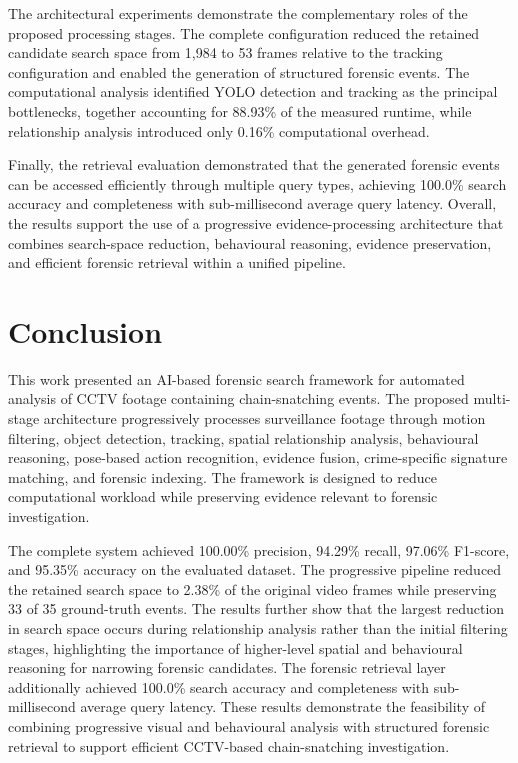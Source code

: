 \documentclass[runningheads]{llncs}
\begin{document}
The architectural experiments demonstrate the complementary roles of
the proposed processing stages. The complete configuration reduced the
retained candidate search space from 1,984 to 53 frames relative to the
tracking configuration and enabled the generation of structured
forensic events. The computational analysis identified YOLO detection
and tracking as the principal bottlenecks, together accounting for
88.93\% of the measured runtime, while relationship analysis introduced
only 0.16\% computational overhead.

Finally, the retrieval evaluation demonstrated that the generated
forensic events can be accessed efficiently through multiple query
types, achieving 100.0\% search accuracy and completeness with
sub-millisecond average query latency. Overall, the results support the
use of a progressive evidence-processing architecture that combines
search-space reduction, behavioural reasoning, evidence preservation,
and efficient forensic retrieval within a unified pipeline.

\section{Conclusion}
This work presented an AI-based forensic search framework for automated
analysis of CCTV footage containing chain-snatching events. The proposed
multi-stage architecture progressively processes surveillance footage
through motion filtering, object detection, tracking, spatial
relationship analysis, behavioural reasoning, pose-based action
recognition, evidence fusion, crime-specific signature matching, and
forensic indexing. The framework is designed to reduce computational
workload while preserving evidence relevant to forensic investigation.

The complete system achieved 100.00\% precision, 94.29\% recall,
97.06\% F1-score, and 95.35\% accuracy on the evaluated dataset. The
progressive pipeline reduced the retained search space to 2.38\% of the
original video frames while preserving 33 of 35 ground-truth events.
The results further show that the largest reduction in search space
occurs during relationship analysis rather than the initial filtering
stages, highlighting the importance of higher-level spatial and
behavioural reasoning for narrowing forensic candidates. The forensic
retrieval layer additionally achieved 100.0\% search accuracy and
completeness with sub-millisecond average query latency. These results
demonstrate the feasibility of combining progressive visual and
behavioural analysis with structured forensic retrieval to support
efficient CCTV-based chain-snatching investigation.



\end{document}
